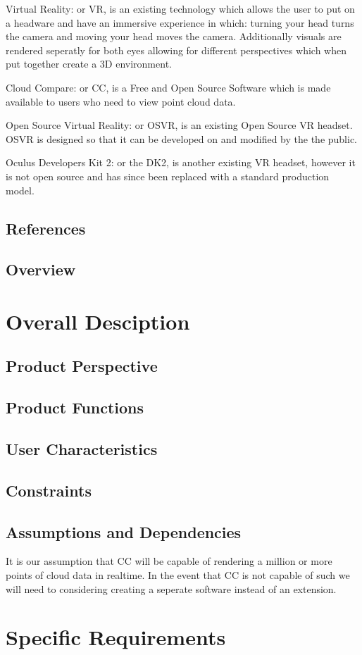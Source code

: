 \documentclass[titlepage]{article}
\begin{document}
Virtual Reality: or VR, is an existing technology which allows the user to put on a headware and have an immersive experience in which:
turning your head turns the camera and
moving your head moves the camera.
Additionally visuals are rendered seperatly for both eyes allowing for different perspectives which when put together create a 3D environment.

Cloud Compare: or CC, is a Free and Open Source Software which is made available to users who need to view point cloud data.

Open Source Virtual Reality: or OSVR, is an existing Open Source VR headset. OSVR is designed so that it can be developed on and modified by the the public.

Oculus Developers Kit 2: or the DK2, is another existing VR headset, however it is not open source and has since been replaced with a standard production model.

\subsection{References}



\subsection{Overview}



\section{Overall Desciption}
\subsection{Product Perspective}



\subsection{Product Functions}

\subsection{User Characteristics}

\subsection{Constraints}

\subsection{Assumptions and Dependencies}

It is our assumption that CC will be capable of rendering a million or more points of cloud data in realtime.
In the event that CC is not capable of such we will need to considering creating a seperate software instead of an extension.

\section{Specific Requirements}
\end{document}
